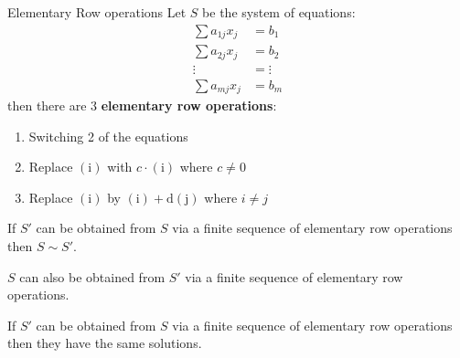 \begin{definition} {Elementary Row operations}
    Let \(S\) be the system of equations:
    \begin{align}
        \sum a_{1j}x_j & = b_1 \tag{1}     \\
        \sum a_{2j}x_j & = b_2  \tag{2}    \\
        \vdots         & =\vdots \nonumber \\
        \sum a_{mj}x_j & = b_m \tag{m}
    \end{align}
    then there are 3 \textbf{elementary row operations}:
    \begin{enumerate}
        \item Switching 2 of the equations
        \item Replace \(\mathrm{(i)}\) with \(c \cdot \mathrm{(i)}\) where \(c \neq 0\)
        \item Replace \(\mathrm{(i)}\) by \(\mathrm{(i) + d(j)}\) where \(i\neq j\)
    \end{enumerate}
\end{definition}

\begin{proposition}\label{prop:2.2}
    If \(S'\) can be obtained from \(S\) via a finite sequence of elementary row operations then \(S \sim S'\). 
\end{proposition}

\begin{corollary}
    \(S\) can also be obtained from \(S'\) via a finite sequence of elementary row operations.
\end{corollary}
\begin{corollary}
    If \(S'\) can be obtained from \(S\) via a finite sequence of elementary row operations then they have the same solutions.
\end{corollary}
